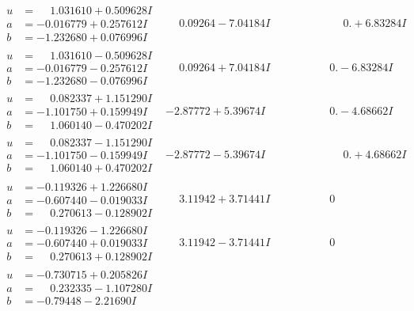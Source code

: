 \documentclass[1p]{elsarticle_modified}
\theoremstyle{definition}
\begin{document}
$$\begin{array}{c|c|c}
\begin{aligned}
u &= \phantom{-}1.031610 + 0.509628 I \\
a &= -0.016779 + 0.257612 I \\
b &= -1.232680 + 0.076996 I\end{aligned}
 & \phantom{-}0.09264 - 7.04184 I & \phantom{-0.000000 -}0. + 6.83284 I \\ \hline\begin{aligned}
u &= \phantom{-}1.031610 - 0.509628 I \\
a &= -0.016779 - 0.257612 I \\
b &= -1.232680 - 0.076996 I\end{aligned}
 & \phantom{-}0.09264 + 7.04184 I & \phantom{-0.000000 } 0. - 6.83284 I \\ \hline\begin{aligned}
u &= \phantom{-}0.082337 + 1.151290 I \\
a &= -1.101750 + 0.159949 I \\
b &= \phantom{-}1.060140 - 0.470202 I\end{aligned}
 & -2.87772 + 5.39674 I & \phantom{-0.000000 } 0. - 4.68662 I \\ \hline\begin{aligned}
u &= \phantom{-}0.082337 - 1.151290 I \\
a &= -1.101750 - 0.159949 I \\
b &= \phantom{-}1.060140 + 0.470202 I\end{aligned}
 & -2.87772 - 5.39674 I & \phantom{-0.000000 -}0. + 4.68662 I \\ \hline\begin{aligned}
u &= -0.119326 + 1.226680 I \\
a &= -0.607440 - 0.019033 I \\
b &= \phantom{-}0.270613 - 0.128902 I\end{aligned}
 & \phantom{-}3.11942 + 3.71441 I & \phantom{-0.000000 } 0 \\ \hline\begin{aligned}
u &= -0.119326 - 1.226680 I \\
a &= -0.607440 + 0.019033 I \\
b &= \phantom{-}0.270613 + 0.128902 I\end{aligned}
 & \phantom{-}3.11942 - 3.71441 I & \phantom{-0.000000 } 0 \\ \hline\begin{aligned}
u &= -0.730715 + 0.205826 I \\
a &= \phantom{-}0.232335 - 1.107280 I \\
b &= -0.79448 - 2.21690 I\end{aligned}

\end{array}$$
\end{document}
